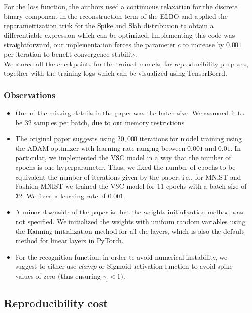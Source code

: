 For the loss function, the authors used a continuous relaxation for the discrete binary component in the reconstruction term of the ELBO and applied the reparametrization trick \supercite{NIPS2015_5666} for the Spike and Slab distribution to obtain a differentiable expression which can be optimized. Implementing this code was straightforward, our implementation forces the parameter $c$ to increase by $0.001$ per iteration to benefit convergence stability. \\

We stored all the checkpoints for the trained models, for reproducibility purposes, together with the training logs which can be visualized using TensorBoard.

\subsubsection{Observations}
\begin{itemize}
    \item One of the missing details in the paper was the batch size. We assumed it to be $32$ samples per batch, due to our memory restrictions. 
    \item The original paper suggests using $20,000$ iterations for model training using the ADAM optimizer \supercite{kingma2014adam} with learning rate ranging between $0.001$ and $0.01$. In particular, we implemented the VSC model in a way that the number of epochs is one hyperparameter. Thus, we fixed the number of epochs to be equivalent the number of iterations given by the paper; i.e., for MNIST and Fashion-MNIST we trained the VSC model for $11$ epochs with a batch size of $32$. We fixed a learning rate of $0.001$.
    \item A minor downside of the paper is that the weights initialization method was not specified. We initialized the weights with uniform random variables using the Kaiming initialization method \supercite{Kaiming2015} for all the layers, which is also the default method for linear layers in PyTorch.
    \item For the recognition function, in order to avoid numerical instability, we suggest to either use $\textit{clamp}$ or Sigmoid activation function to avoid spike values of zero (thus ensuring $\gamma_i < 1$).
\end{itemize}

\subsection{Reproducibility cost}

